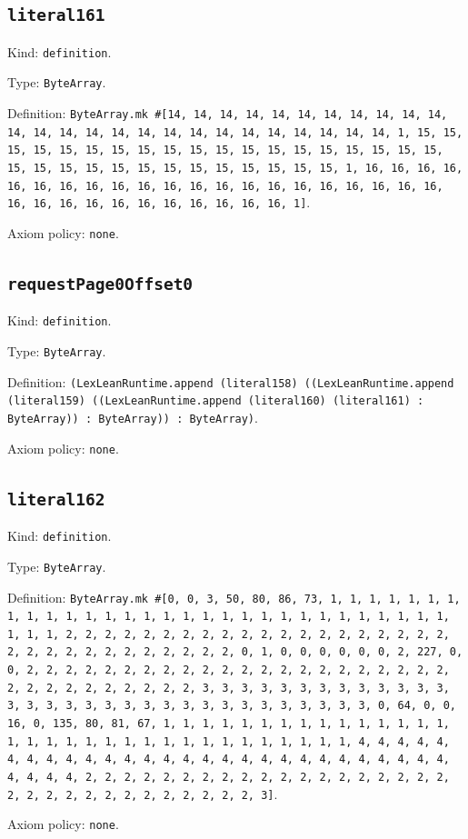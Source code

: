 \documentclass[11pt]{article}
\begin{document}
\subsection*{\texttt{literal161}}
\noindent Kind: \texttt{definition}.\par
\noindent Type: \texttt{ByteArray}.\par
\noindent Definition: \texttt{ByteArray.mk \#[14, 14, 14, 14, 14, 14, 14, 14, 14, 14, 14, 14, 14, 14, 14, 14, 14, 14, 14, 14, 14, 14, 14, 14, 14, 14, 1, 15, 15, 15, 15, 15, 15, 15, 15, 15, 15, 15, 15, 15, 15, 15, 15, 15, 15, 15, 15, 15, 15, 15, 15, 15, 15, 15, 15, 15, 15, 15, 15, 1, 16, 16, 16, 16, 16, 16, 16, 16, 16, 16, 16, 16, 16, 16, 16, 16, 16, 16, 16, 16, 16, 16, 16, 16, 16, 16, 16, 16, 16, 16, 16, 16, 1]}.\par
\noindent Axiom policy: \texttt{none}.\par
\subsection*{\texttt{requestPage0Offset0}}
\noindent Kind: \texttt{definition}.\par
\noindent Type: \texttt{ByteArray}.\par
\noindent Definition: \texttt{(LexLeanRuntime.append (literal158) ((LexLeanRuntime.append (literal159) ((LexLeanRuntime.append (literal160) (literal161) : ByteArray)) : ByteArray)) : ByteArray)}.\par
\noindent Axiom policy: \texttt{none}.\par
\subsection*{\texttt{literal162}}
\noindent Kind: \texttt{definition}.\par
\noindent Type: \texttt{ByteArray}.\par
\noindent Definition: \texttt{ByteArray.mk \#[0, 0, 3, 50, 80, 86, 73, 1, 1, 1, 1, 1, 1, 1, 1, 1, 1, 1, 1, 1, 1, 1, 1, 1, 1, 1, 1, 1, 1, 1, 1, 1, 1, 1, 1, 1, 1, 1, 1, 1, 2, 2, 2, 2, 2, 2, 2, 2, 2, 2, 2, 2, 2, 2, 2, 2, 2, 2, 2, 2, 2, 2, 2, 2, 2, 2, 2, 2, 2, 2, 2, 2, 0, 1, 0, 0, 0, 0, 0, 0, 2, 227, 0, 0, 2, 2, 2, 2, 2, 2, 2, 2, 2, 2, 2, 2, 2, 2, 2, 2, 2, 2, 2, 2, 2, 2, 2, 2, 2, 2, 2, 2, 2, 2, 2, 2, 3, 3, 3, 3, 3, 3, 3, 3, 3, 3, 3, 3, 3, 3, 3, 3, 3, 3, 3, 3, 3, 3, 3, 3, 3, 3, 3, 3, 3, 3, 3, 3, 0, 64, 0, 0, 16, 0, 135, 80, 81, 67, 1, 1, 1, 1, 1, 1, 1, 1, 1, 1, 1, 1, 1, 1, 1, 1, 1, 1, 1, 1, 1, 1, 1, 1, 1, 1, 1, 1, 1, 1, 1, 1, 1, 4, 4, 4, 4, 4, 4, 4, 4, 4, 4, 4, 4, 4, 4, 4, 4, 4, 4, 4, 4, 4, 4, 4, 4, 4, 4, 4, 4, 4, 4, 4, 4, 2, 2, 2, 2, 2, 2, 2, 2, 2, 2, 2, 2, 2, 2, 2, 2, 2, 2, 2, 2, 2, 2, 2, 2, 2, 2, 2, 2, 2, 2, 2, 2, 3]}.\par
\noindent Axiom policy: \texttt{none}.\par
\end{document}
